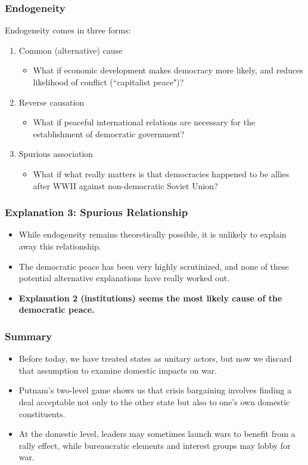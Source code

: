 \documentclass[handout]{beamer}
\begin{document}
\begin{frame} 
	\frametitle{\LARGE{Endogeneity}}
Endogeneity comes in three forms:
	\begin{enumerate}
		\item Common (alternative) cause \pause
		\begin{itemize}
			\item What if economic development makes democracy more likely, and reduces likelihood of conflict (``capitalist peace")?
		\end{itemize}
		\item Reverse causation \pause
		\begin{itemize}
			\item What if peaceful international relations are necessary for the establishment of democratic government?
		\end{itemize}
			\item Spurious association \pause
		\begin{itemize}
			\item What if what really matters is that democracies happened to be allies after WWII against non-democratic Soviet Union?
		\end{itemize}
	\end{enumerate}
\end{frame}

\begin{frame} 
	\frametitle{\LARGE{Explanation 3: Spurious Relationship}}
	\begin{itemize}
		\item While endogeneity remains theoretically possible, it is unlikely to explain away this relationship.
		\item The democratic peace has been very highly scrutinized, and none of these potential alternative explanations have really worked out. \pause
		\item \textbf{Explanation 2 (institutions) seems the most likely cause of the democratic peace.}
	\end{itemize}
\end{frame}

\begin{frame} 
	\frametitle{\LARGE{Summary}}
	\begin{itemize}
		\item Before today, we have treated states as unitary actors, but now we discard that assumption to examine domestic impacts on war.
		\item Putnam's two-level game shows us that crisis bargaining involves finding a deal acceptable not only to the other state but also to one's own domestic constituents.
		\item At the domestic level, leaders may sometimes launch wars to benefit from a rally effect, while bureaucratic elements and interest groups may lobby for war. 
	\end{itemize}
\end{frame}
\end{document}

